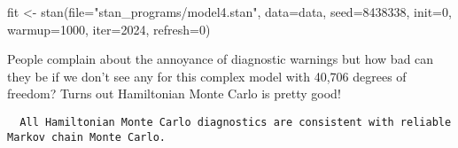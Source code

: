 \documentclass[
  letterpaper,
  DIV=11,
  numbers=noendperiod]{scrartcl}
\newenvironment{Shaded}{\begin{snugshade}}{\end{snugshade}}
\newcommand{\AttributeTok}[1]{\textcolor[rgb]{0.40,0.45,0.13}{#1}}
\newcommand{\DecValTok}[1]{\textcolor[rgb]{0.68,0.00,0.00}{#1}}
\newcommand{\FunctionTok}[1]{\textcolor[rgb]{0.28,0.35,0.67}{#1}}
\newcommand{\NormalTok}[1]{\textcolor[rgb]{0.00,0.23,0.31}{#1}}
\newcommand{\OtherTok}[1]{\textcolor[rgb]{0.00,0.23,0.31}{#1}}
\newcommand{\SpecialCharTok}[1]{\textcolor[rgb]{0.37,0.37,0.37}{#1}}
\newcommand{\StringTok}[1]{\textcolor[rgb]{0.13,0.47,0.30}{#1}}
\begin{document}
\begin{Shaded}
\begin{Highlighting}[]
\NormalTok{fit }\OtherTok{\textless{}{-}} \FunctionTok{stan}\NormalTok{(}\AttributeTok{file=}\StringTok{"stan\_programs/model4.stan"}\NormalTok{,}
            \AttributeTok{data=}\NormalTok{data, }\AttributeTok{seed=}\DecValTok{8438338}\NormalTok{, }\AttributeTok{init=}\DecValTok{0}\NormalTok{,}
            \AttributeTok{warmup=}\DecValTok{1000}\NormalTok{, }\AttributeTok{iter=}\DecValTok{2024}\NormalTok{, }\AttributeTok{refresh=}\DecValTok{0}\NormalTok{)}
\end{Highlighting}
\end{Shaded}

People complain about the annoyance of diagnostic warnings but how bad
can they be if we don't see any for this complex model with 40,706
degrees of freedom? Turns out Hamiltonian Monte Carlo is pretty good!

\begin{Shaded}
\end{Shaded}

\begin{verbatim}
  All Hamiltonian Monte Carlo diagnostics are consistent with reliable
Markov chain Monte Carlo.
\end{verbatim}
\end{document}
